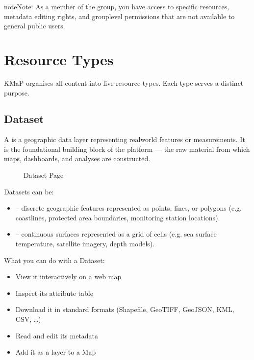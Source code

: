 \documentclass[letterpaper,10pt,english]{sphinxmanual}
\begin{document}
\begin{sphinxadmonition}{note}{Note:}
\sphinxAtStartPar
As a member of the  group, you have access to specific resources,
metadata editing rights, and group\sphinxhyphen{}level permissions that are not available to
general public users.
\end{sphinxadmonition}


\section{Resource Types}
\label{\detokenize{01_welcome:resource-types}}
\sphinxAtStartPar
KMaP organises all content into five resource types. Each type serves a distinct purpose.


\subsection{Dataset}
\label{\detokenize{01_welcome:dataset}}
\sphinxAtStartPar
A  is a geographic data layer representing real\sphinxhyphen{}world features or measurements.
It is the foundational building block of the platform — the raw material from which maps,
dashboards, and analyses are constructed.

\begin{figure}[htbp]
\centering
\capstart

\noindent{}
\caption{Dataset Page}\label{\detokenize{01_welcome:id2}}\end{figure}

\sphinxAtStartPar
Datasets can be:
\begin{itemize}
\item {} 
\sphinxAtStartPar
{} – discrete geographic features represented as points, lines, or polygons
(e.g. coastlines, protected area boundaries, monitoring station locations).

\item {} 
\sphinxAtStartPar
{} – continuous surfaces represented as a grid of cells
(e.g. sea surface temperature, satellite imagery, depth models).

\end{itemize}

\sphinxAtStartPar
What you can do with a Dataset:
\begin{itemize}
\item {} 
\sphinxAtStartPar
View it interactively on a web map

\item {} 
\sphinxAtStartPar
Inspect its attribute table

\item {} 
\sphinxAtStartPar
Download it in standard formats (Shapefile, GeoTIFF, GeoJSON, KML, CSV, …)

\item {} 
\sphinxAtStartPar
Read and edit its metadata

\item {} 
\sphinxAtStartPar
Add it as a layer to a Map

\end{itemize}
\end{document}
